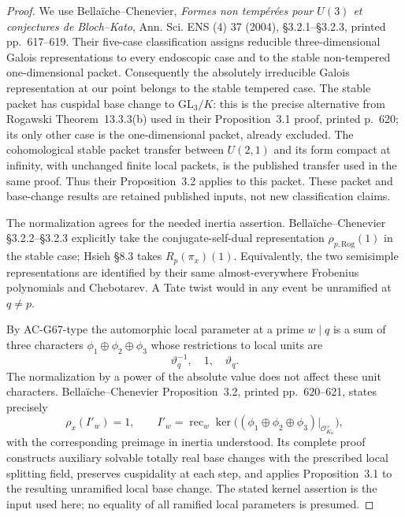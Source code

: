 \begin{proof}
We use Bella\"iche--Chenevier,
\emph{Formes non temp\'er\'ees pour $U(3)$ et conjectures
de Bloch--Kato}, Ann. Sci. ENS (4) 37 (2004),
\S3.2.1--\S3.2.3, printed pp.~617--619.
Their five-case classification assigns reducible
three-dimensional Galois representations to every
endoscopic case and to the stable non-tempered
one-dimensional packet.  Consequently the absolutely
irreducible Galois representation at our point belongs
to the stable tempered case.
The stable packet has cuspidal base change to
$\mathrm{GL}_3/K$: this is the precise alternative from
Rogawski Theorem~13.3.3(b) used in their Proposition~3.1
proof, printed p.~620; its only other case is the
one-dimensional packet, already excluded.
The cohomological stable packet transfer between
$U(2,1)$ and its form compact at infinity, with unchanged
finite local packets, is the published transfer used
in the same proof.  Thus their Proposition~3.2 applies
to this packet.  These packet and base-change results
are retained published inputs, not new classification
claims.

The normalization agrees for the needed inertia
assertion.  Bella\"iche--Chenevier \S3.2.2--\S3.2.3
explicitly take the conjugate-self-dual representation
$\rho_{p,\mathrm{Rog}}(1)$ in the stable case;
Hsieh \S8.3 takes $R_p(\pi_x)(1)$.
Equivalently, the two semisimple representations are
identified by their same almost-everywhere Frobenius
polynomials and Chebotarev.
A Tate twist would in any event be unramified at $q\ne p$.

By AC-G67-type the automorphic local parameter at a
prime $w\mid q$ is a sum of three characters
$\phi_1\oplus\phi_2\oplus\phi_3$ whose restrictions
to local units are
\[
                 \vartheta_q^{-1},\quad1,\quad\vartheta_q.
                                                        \tag{G70.10}
\]
The normalization by a power of the absolute value does
not affect these unit characters.
Bella\"iche--Chenevier Proposition~3.2, printed
pp.~620--621, states precisely
\[
 \rho_x(I'_w)=1,
 \qquad
 I'_w=\operatorname{rec}_w
       \ker\bigl((\phi_1\oplus\phi_2\oplus\phi_3)
                                      |_{\mathcal O_{K_w}^{\times}}\bigr),
                                                        \tag{G70.11}
\]
with the corresponding preimage in inertia understood.
Its complete proof constructs auxiliary solvable totally
real base changes with the prescribed local splitting
field, preserves cuspidality at each step, and applies
Proposition~3.1 to the resulting unramified local
base change.  The stated kernel assertion is the input
used here; no equality of all ramified local parameters
is presumed.


\end{proof}
